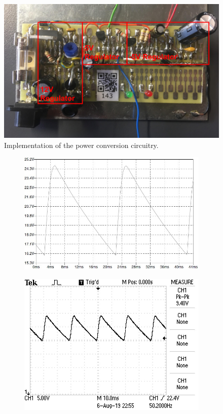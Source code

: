 \begin{figure}[!ht]
    \centering
  	\includegraphics[width=0.5\linewidth]{./Figures/pwr_pcb.png}
	\caption{Implementation of the power conversion circuitry. } \label{subfig:pwr_pcb}
\end{figure}

\begin{figure}
 \footnotesize
 \centering
    \begin{subfigure}[]{0.35\textwidth}
              \centering
  		\includegraphics[width=1\linewidth]{./Figures/pwr_simu_rect.JPG}
		    \caption{} \label{subfig:pwr_simu_rect}
     \end{subfigure}
          \begin{subfigure}[]{0.35\textwidth}
             \centering
  		\includegraphics[width=1.0\linewidth]{./Figures/pwr_meas_rect.jpg}

\end{subfigure}
\end{figure}
